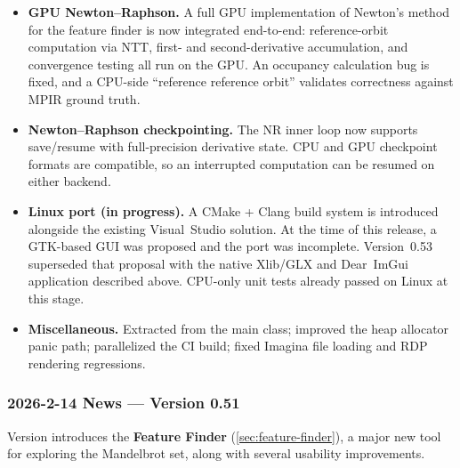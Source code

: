 \begin{itemize}
\item \textbf{GPU Newton--Raphson.}  A full GPU implementation of Newton's method
  for the feature finder is now integrated end-to-end: reference-orbit
  computation via NTT, first- and second-derivative accumulation, and
  convergence testing all run on the GPU.  An occupancy calculation bug is
  fixed, and a CPU-side ``reference reference orbit'' validates correctness
  against MPIR ground truth.

\item \textbf{Newton--Raphson checkpointing.}  The NR inner loop now supports
  save/resume with full-precision derivative state.  CPU and GPU checkpoint
  formats are compatible, so an interrupted computation can be resumed on
  either backend.

\item \textbf{Linux port (in progress).} A CMake + Clang build system is
  introduced alongside the existing Visual~Studio solution. At the time of
  this release, a GTK-based GUI was proposed and the port was incomplete.
  Version~0.53 superseded that proposal with the native Xlib/GLX and
  Dear~ImGui application described above. CPU-only unit tests already passed on
  Linux at this stage.

\item \textbf{Miscellaneous.}  Extracted  from
  the main class; improved the heap allocator panic path; parallelized the
  CI build; fixed Imagina file loading and RDP rendering regressions.
\end{itemize}

\subsubsection{2026-2-14 News --- Version 0.51}

Version  introduces the \textbf{Feature Finder} (\cref{sec:feature-finder}), a major new tool
for exploring the Mandelbrot set, along with several usability improvements.

